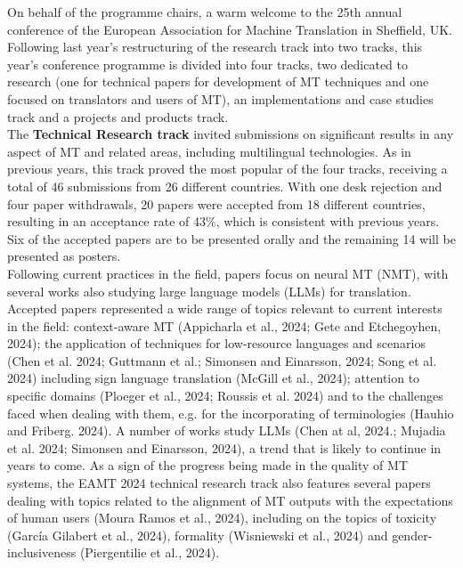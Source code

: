 On behalf of the programme chairs, a warm welcome to the 25th annual conference of the European Association for Machine Translation in Sheffield, UK. Following last year’s restructuring of the research track into two tracks, this year’s conference programme is divided into four tracks, two dedicated to research (one for technical papers for development of MT techniques and one focused on translators and users of MT), an implementations and case studies track and a projects and products track.
\\

The {\bf Technical Research track} invited submissions on significant results in any aspect of MT and related areas, including multilingual technologies. As in previous years, this track proved the most popular of the four tracks, receiving a total of 46 submissions from 26 different countries. With one desk rejection and four paper withdrawals, 20 papers were accepted from 18 different countries, resulting in an acceptance rate of 43\%, which is consistent with previous years. Six of the accepted papers are to be presented orally and the remaining 14 will be presented as posters.
\\

Following current practices in the field, papers focus on neural MT (NMT), with several works also studying large language models (LLMs) for translation. Accepted papers represented a wide range of topics relevant to current interests in the field: context-aware MT (Appicharla et al., 2024; Gete and Etchegoyhen, 2024); the application of techniques for low-resource languages and scenarios (Chen et al. 2024; Guttmann et al.; Simonsen and Einarsson, 2024; Song et al. 2024) including sign language translation (McGill et al., 2024); attention to specific domains (Ploeger et al., 2024; Roussis et al. 2024)  and to the challenges faced when dealing with them, e.g. for the incorporating of terminologies (Hauhio and Friberg. 2024). A number of works study LLMs (Chen at al, 2024.; Mujadia et al. 2024; Simonsen and Einarsson, 2024), a trend that is likely to continue in years to come. As a sign of the progress being made in the quality of MT systems, the EAMT 2024 technical research track also features several papers dealing with topics related to the alignment of MT outputs with the expectations of human users (Moura Ramos et al.,  2024), including on the topics of toxicity (García Gilabert et al., 2024), formality (Wisniewski et al., 2024) and gender-inclusiveness (Piergentilie et al., 2024).
\\

